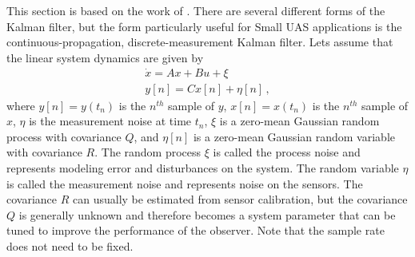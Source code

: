 This section is based on the work of \cite{Beard2010}. There are several different forms of the Kalman filter, but the form particularly useful for Small UAS applications is the continuous-propagation, discrete-measurement Kalman filter.
Lets assume that the linear system dynamics are given by
\begin{equation}\label{eq:linear_model}
\begin{aligned}
\dot{x}=Ax+Bu+\xi\\
y[n]=Cx[n]+\eta[n]\,,
\end{aligned}
\end{equation}
where \begin{math} y[n] = y(t_n) \end{math} is the \begin{math} n^{th} \end{math} sample of \begin{math} y \end{math}, \begin{math} x[n] = x(t_n) \end{math} is the \begin{math} n^{th} \end{math} sample of \begin{math} x \end{math}, \begin{math} \eta \end{math} is the measurement noise at time \begin{math} t_n\end{math}, \begin{math} \xi \end{math} is a zero-mean Gaussian random process with covariance \begin{math} Q \end{math}, and \begin{math} \eta[n] \end{math} is a zero-mean Gaussian random variable with covariance \begin{math} R \end{math}. The random process \begin{math} \xi \end{math} is called the process noise and represents modeling error and disturbances on the system. The random variable \begin{math} \eta \end{math} is called the measurement noise and represents noise on the sensors. The covariance \begin{math} R \end{math} can usually be estimated from sensor calibration, but the covariance \begin{math} Q \end{math} is generally unknown and therefore becomes a system parameter that can be tuned to improve the performance of the observer. Note that the sample rate does not need to be fixed. \linebreak
